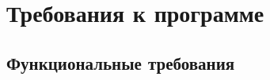 \documentclass[a4paper,12pt,reqno]{article}
\begin{document}
    \section{Требования к программе}

    \subsection{Функциональные требования} \label{label:funcreq}



\end{document}
